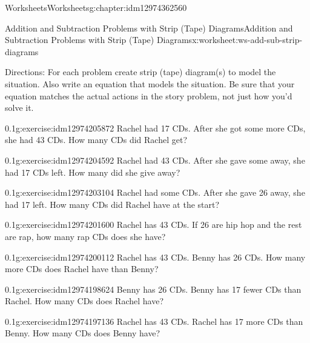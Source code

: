 \documentclass[twoside,11pt,]{book}
\begin{document}
\begin{chapterptx}{Worksheets}{}{Worksheets}{}{}{g:chapter:idm12974362560}
%
\begin{worksheet-section-numberless}{Addition and Subtraction Problems with Strip (Tape) Diagrams}{}{Addition and Subtraction Problems with Strip (Tape) Diagrams}{}{}{x:worksheet:ws-add-sub-strip-diagrams}
\begin{introduction}{}%
Directions: For each problem create strip (tape) diagram(s) to model the situation.  Also write an equation that models the situation.  Be sure that your equation matches the actual actions in the story problem, not just how you’d solve it.%
\end{introduction}%
\begin{divisionexercise}{1}{}{0.1}{g:exercise:idm12974205872}%
Rachel had 17 CDs.  After she got some more CDs, she had 43 CDs.  How many CDs did Rachel get?%
\end{divisionexercise}%
\begin{divisionexercise}{2}{}{0.1}{g:exercise:idm12974204592}%
Rachel had 43 CDs.  After she gave some away, she had 17 CDs left.  How many did she give away?%
\end{divisionexercise}%
\begin{divisionexercise}{3}{}{0.1}{g:exercise:idm12974203104}%
Rachel had some CDs.  After she gave 26 away, she had 17 left.  How many CDs did Rachel have at the start?%
\end{divisionexercise}%
\begin{divisionexercise}{4}{}{0.1}{g:exercise:idm12974201600}%
Rachel has 43 CDs.  If 26 are hip hop and the rest are rap, how many rap CDs does she have?%
\end{divisionexercise}%
\begin{divisionexercise}{5}{}{0.1}{g:exercise:idm12974200112}%
Rachel has 43 CDs.  Benny has 26 CDs.  How many more CDs does Rachel have than Benny?%
\end{divisionexercise}%
\begin{divisionexercise}{6}{}{0.1}{g:exercise:idm12974198624}%
Benny has 26 CDs. Benny has 17 fewer CDs than Rachel.  How many CDs does Rachel have?%
\end{divisionexercise}%
\begin{divisionexercise}{7}{}{0.1}{g:exercise:idm12974197136}%
Rachel has 43 CDs. Rachel has 17 more CDs than Benny.  How many CDs does Benny have?%
\end{divisionexercise}%
\end{worksheet-section-numberless}
\restoregeometry
%
%

\end{chapterptx}
\end{document}
